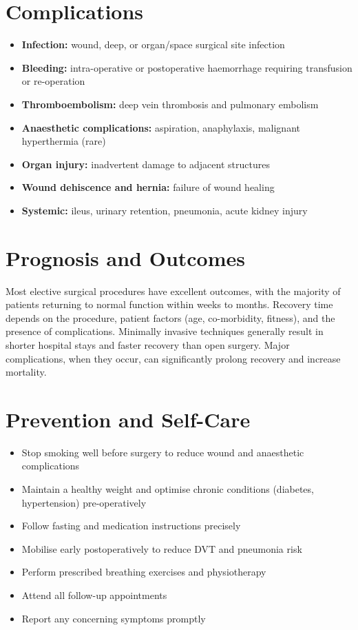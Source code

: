 \section*{Complications}
\begin{itemize}
    \item \textbf{Infection:} wound, deep, or organ/space surgical site infection
    \item \textbf{Bleeding:} intra-operative or postoperative haemorrhage requiring transfusion or re-operation
    \item \textbf{Thromboembolism:} deep vein thrombosis and pulmonary embolism
    \item \textbf{Anaesthetic complications:} aspiration, anaphylaxis, malignant hyperthermia (rare)
    \item \textbf{Organ injury:} inadvertent damage to adjacent structures
    \item \textbf{Wound dehiscence and hernia:} failure of wound healing
    \item \textbf{Systemic:} ileus, urinary retention, pneumonia, acute kidney injury
\end{itemize}

\section*{Prognosis and Outcomes}
Most elective surgical procedures have excellent outcomes, with the majority of patients returning to normal function within weeks to months. Recovery time depends on the procedure, patient factors (age, co-morbidity, fitness), and the presence of complications. Minimally invasive techniques generally result in shorter hospital stays and faster recovery than open surgery. Major complications, when they occur, can significantly prolong recovery and increase mortality.

\section*{Prevention and Self-Care}
\begin{itemize}
    \item Stop smoking well before surgery to reduce wound and anaesthetic complications
    \item Maintain a healthy weight and optimise chronic conditions (diabetes, hypertension) pre-operatively
    \item Follow fasting and medication instructions precisely
    \item Mobilise early postoperatively to reduce DVT and pneumonia risk
    \item Perform prescribed breathing exercises and physiotherapy
    \item Attend all follow-up appointments
    \item Report any concerning symptoms promptly
\end{itemize}
